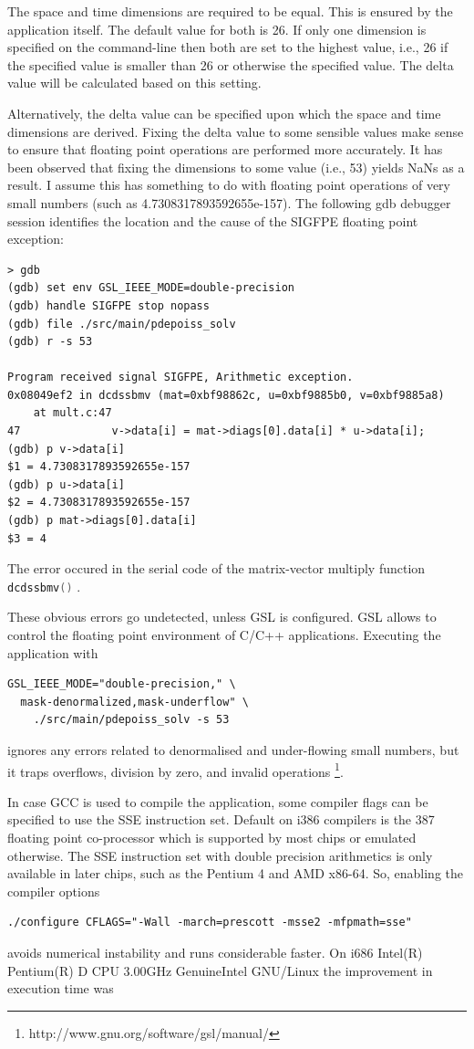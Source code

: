 \documentclass[12pt,a4paper]{report}
\def\ccode#1{
  \lstinline[basicstyle=\ttfamily,language=C]{#1} }
\begin{document}
The space and time dimensions are required to be equal. This is
ensured by the application itself. The default value for both is
26. If only one dimension is specified on the command-line then both
are set to the highest value, i.e., 26 if the specified value is
smaller than 26 or otherwise the specified value. The delta value will
be calculated based on this setting.

Alternatively, the delta value can be specified upon which the space
and time dimensions are derived. Fixing the delta value to some
sensible values make sense to ensure that floating point operations
are performed more accurately. It has been observed that fixing the
dimensions to some value (i.e., 53) yields NaNs as a result. I assume
this has something to do with floating point operations of very small
numbers (such as 4.7308317893592655e-157). The following gdb debugger
session identifies the location and the cause of the SIGFPE floating
point exception:

\begin{verbatim}
> gdb
(gdb) set env GSL_IEEE_MODE=double-precision
(gdb) handle SIGFPE stop nopass
(gdb) file ./src/main/pdepoiss_solv
(gdb) r -s 53

Program received signal SIGFPE, Arithmetic exception.
0x08049ef2 in dcdssbmv (mat=0xbf98862c, u=0xbf9885b0, v=0xbf9885a8)
    at mult.c:47
47              v->data[i] = mat->diags[0].data[i] * u->data[i];
(gdb) p v->data[i]
$1 = 4.7308317893592655e-157
(gdb) p u->data[i]
$2 = 4.7308317893592655e-157
(gdb) p mat->diags[0].data[i]
$3 = 4
\end{verbatim}

The error occured in the serial code of the matrix-vector multiply
function \ccode{dcdssbmv()}.

These obvious errors go undetected, unless GSL is configured. GSL
allows to control the floating point environment of C/C++
applications. Executing the application with

\begin{verbatim}
GSL_IEEE_MODE="double-precision," \
  mask-denormalized,mask-underflow" \
    ./src/main/pdepoiss_solv -s 53
\end{verbatim}

ignores any errors related to denormalised and under-flowing small
numbers, but it traps overflows, division by zero, and invalid
operations \footnote{http://www.gnu.org/software/gsl/manual/}.

In case GCC is used to compile the application, some compiler flags
can be specified to use the SSE instruction set. Default on i386
compilers is the 387 floating point co-processor which is supported by
most chips or emulated otherwise. The SSE instruction set with double
precision arithmetics is only available in later chips, such as the
Pentium 4 and AMD x86-64. So, enabling the compiler options
\begin{verbatim}
./configure CFLAGS="-Wall -march=prescott -msse2 -mfpmath=sse"
\end{verbatim}
avoids numerical instability and runs considerable faster. On i686
Intel(R) Pentium(R) D CPU 3.00GHz GenuineIntel GNU/Linux the
improvement in execution time was
\end{document}
